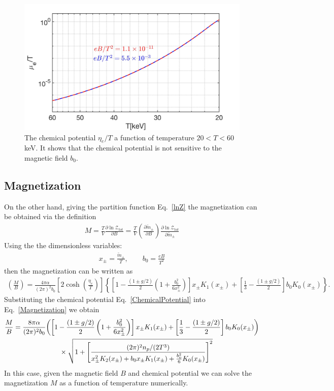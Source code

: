 \documentclass[Universe,article,submit,moreauthors,pdftex]{Definitions/mdpi}
\newcommand*{\req}[1]{Eq.~{\eqref{#1}}}
\begin{document}
\begin{figure}[h]
\centering
\includegraphics[width=0.75\linewidth]{./plots/ChemicalPotential_case1.jpg}
\caption{The chemical potential $\eta_{e}/T$ a function of temperature $20<T<60$keV.  It shows that the chemical potential is not sensitive to the magnetic field $b_0$.}
\label{chemical_fig} 
\end{figure}


\subsection{Magnetization}
On the other hand, giving the partition function \req{lnZ} the magnetization can be obtained via the definition
\begin{align}
M=\frac{T}{V}\frac{\partial \ln\mathcal{Z}_{tot}}{\partial B}=\frac{T}{V}\left(\frac{\partial\tilde m_\pm}{\partial B}\right)\frac{\partial \ln\mathcal{Z}_{tot}}{\partial\tilde m_\pm}
\end{align}
Using the the dimensionless variables:
\begin{align}
x_\pm=\frac{\tilde m_\pm}{T},\qquad b_0=\frac{eB}{T^2}
\end{align}
then the magnetization can be written as
\begin{align}\label{Magnetization}
\left(\frac{M}{B}\right)=\frac{4\pi\alpha}{(2\pi)^2b_0}\left[2\cosh\left(\frac{\eta_{e}}{T}\right)\right]\left\{\left[1-\frac{(1\pm g/2)}{2}\left(1+\frac{b^2_0}{6x^2_\pm}\right)\right]x_\pm K_1(x_\pm)+\left[\frac{1}{3}-\frac{(1\pm g/2)}{2}\right]b_0K_0(x_\pm)\right\}.
\end{align}
Substituting the chemical potential \req{ChemicalPotential} into \req{Magnetization} we obtain
\begin{align}
\frac{M}{B}=\frac{8\pi\alpha}{(2\pi)^2b_0}&{\left(\left[1-\frac{(1\pm g/2)}{2}\left(1+\frac{b^2_0}{6x^2_\pm}\right)\right]x_\pm K_1(x_\pm)+\left[\frac{1}{3}-\frac{(1\pm g/2)}{2}\right]b_0K_0(x_\pm)\right)}\notag\\
&\qquad\times\sqrt{1+\left[\frac{{(2\pi)^2n_p}/{(2T^3)}}{x_\pm^2K_2(x_\pm)+b_0x_\pm K_1(x_\pm)+\frac{b^2_0}{6}K_0(x_\pm)}\right]^2}
\end{align}
In this case, given the magnetic field $B$ and chemical potential we can solve the magnetization $M$ as a function of temperature numerically.
\end{document}
